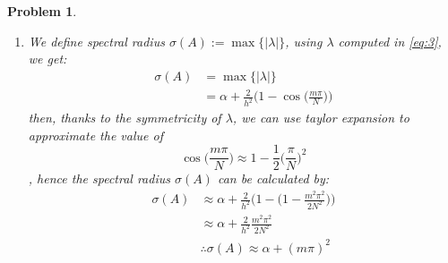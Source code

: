\documentclass[a4paper,12pt]{article}
\newtheorem{prob}{Problem}[]
\begin{document}
\begin{prob}
\begin{enumerate}[label=(\alph*)]
\begin{equation*}
\begin{aligned}
		\end{aligned}
		\end{equation*}
		to find $\lambda$, we set $\sin\frac{m\pi i}{N}$ equal to some constant $C$, so that:
		\begin{equation*}
		\bigg(\alpha+\frac{2}{h^2} - \lambda - \frac{2}{h^2} \cos\bigg(\frac{m\pi}{N}\bigg)\bigg) = 0
		\end{equation*}
		\begin{equation}\label{eq:3}
		\therefore \lambda = \alpha+\frac{2}{h^2} \bigg(1 - \cos\bigg(\frac{m\pi}{N}\bigg) \bigg)
		\end{equation}
		With Eigenvectors:
		\begin{equation*}
		\therefore v = \sin\bigg(\frac{m\pi i}{N}\bigg)
		\end{equation*}
		
		\item We define spectral radius $\sigma(A) := \max\{|\lambda|\}$, using $\lambda$ computed in \eqref{eq:3}, we get:
		\begin{equation*}
		\begin{aligned}
		\sigma(A) &= \max\{|\lambda|\}\\
		&= \alpha+\frac{2}{h^2} \bigg(1 - \cos\bigg(\frac{m\pi}{N}\bigg) \bigg)
		\end{aligned}
		\end{equation*}
		then, thanks to the symmetricity of $\lambda$, we can use taylor expansion to approximate the value of $$\cos\bigg(\frac{m\pi}{N}\bigg) \approx 1 - \frac{1}{2}\bigg(\frac{\pi}{N}\bigg)^2$$, hence the spectral radius $\sigma(A)$ can be calculated by:
		\begin{equation*}
		\begin{aligned}
		\sigma(A) &\approx \alpha+\frac{2}{h^2} \bigg(1 - \bigg( 1 - \frac{m^2\pi^2}{2N^2}\bigg) \bigg)\\
		&\approx \alpha + \frac{2}{h^2} \frac{m^2\pi^2}{2N^2}\\
		&\therefore \sigma(A) \approx \alpha + (m\pi)^2
		\end{aligned}
		\end{equation*}
		

\end{enumerate}
\end{prob}
\end{document}
